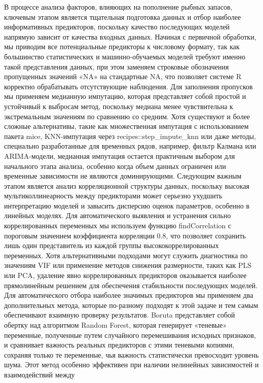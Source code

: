 \documentclass[
  letterpaper,
  DIV=11,
  numbers=noendperiod]{scrreprt}
\begin{document}
В процессе анализа факторов, влияющих на пополнение рыбных запасов,
ключевым этапом является тщательная подготовка данных и отбор наиболее
информативных предикторов, поскольку качество последующих моделей
напрямую зависит от качества входных данных. Начиная с первичной
обработки, мы приводим все потенциальные предикторы к числовому формату,
так как большинство статистических и машинно-обучаемых моделей требуют
именно такой представления данных, при этом заменяем строковые
обозначения пропущенных значений «NA» на стандартные NA, что позволяет
системе R корректно обрабатывать отсутствующие наблюдения. Для
заполнения пропусков мы применяем медианную импутацию, которая
представляет собой простой и устойчивый к выбросам метод, поскольку
медиана менее чувствительна к экстремальным значениям по сравнению со
средним. Хотя существуют и более сложные альтернативы, такие как
множественная импутация с использованием пакета mice, KNN-импутация
через recipes::step\_impute\_knn или даже методы, специально
разработанные для временных рядов, например, фильтр Калмана или
ARIMA-модели, медианная импутация остается практичным выбором для
начального этапа анализа, особенно когда объем данных ограничен или
временные зависимости не являются доминирующими. Следующим важным этапом
является анализ корреляционной структуры данных, поскольку высокая
мультиколлинеарность между предикторами может серьезно ухудшить
интерпретацию моделей и завысить дисперсию оценок параметров, особенно в
линейных моделях. Для автоматического выявления и устранения сильно
коррелированных переменных мы используем функцию findCorrelation с
пороговым значением коэффициента корреляции 0.8, что позволяет сохранить
лишь один представитель из каждой группы высококоррелированных
переменных. Хотя альтернативными подходами могут служить диагностика по
значениям VIF или применение методов снижения размерности, таких как PLS
или PCA, удаление явно коррелированных предикторов оказывается наиболее
прямолинейным решением для обеспечения стабильности последующих моделей.
Для автоматического отбора наиболее значимых предикторов мы применяем
два дополнительных метода, которые по-разному подходят к этой задаче и
тем самым обеспечивают взаимную проверку результатов. Boruta
представляет собой обертку над алгоритмом Random Forest, которая
генерирует «теневые» переменные, полученные путем случайного
перемешивания исходных признаков, и сравнивает важность реальных
предикторов с этими теневыми копиями, сохраняя только те переменные, чья
важность статистически превосходит уровень шума. Этот метод особенно
эффективен при наличии нелинейных зависимостей и взаимодействий между
\end{document}
